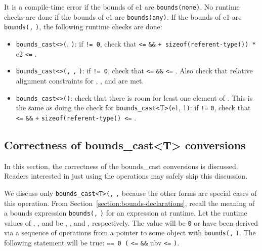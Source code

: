 It is a compile-time error if the bounds of e1 are
\texttt{bounds(none)}. No runtime checks are done if the bounds of e1
are \texttt{bounds(any)}. If the bounds of e1 are
\texttt{bounds(}\texttt{,} \texttt{)}, the following
runtime checks are done:

\begin{itemize}
\item
  \texttt{bounds\_cast\textless{}}\texttt{\textgreater{}(},
  \texttt{)}: if  \texttt{!= 0}, check that 
  \texttt{\textless{}=}  \texttt{\&\&}  \texttt{+
  sizeof(referent-type(}\texttt{)) *} e2 \texttt{\textless{}=}
  .
\item
  \texttt{bounds\_cast\textless{}}\texttt{\textgreater{}(}\texttt{,}
  \texttt{,} \texttt{)}: if  \texttt{!= 0},
  check that  \texttt{\textless{}=}  \texttt{\&\&}
   \texttt{\textless{}=} . Also check that relative
  alignment constraints for , , and  are met.
\item
  \texttt{bounds\_cast\textless{}}\texttt{\textgreater{}(}\texttt{)}:
  check that there is room for least one element of . This is
  the same as doing the check for
  \texttt{bounds\_cast\textless{}}T\texttt{\textgreater{}(}e1,
  1\texttt{)}: if  \texttt{!=} \texttt{0}, check that 
  \texttt{\textless{}=}  \texttt{\&\&}  \texttt{+}
  \texttt{sizeof(referent-type(}\texttt{) \textless{}=}
  .
\end{itemize}

\subsection{Correctness of bounds\_cast\textless{}T\textgreater{} conversions}

In this section, the correctness of the bounds\_cast conversions is
discussed. Readers interested in just using the operations may safely
skip this discussion.

We discuss only
\texttt{bounds\_cast\textless{}T\textgreater{}(}\texttt{,}
\texttt{,}  because the other forms are special cases
of this operation. From Section~\ref{section:bounds-declarations},
recall the meaning of a bounds
expression \texttt{bounds(}\texttt{,} \texttt{)} for
an expression  at runtime. Let the runtime values of ,
, and  be , , and ,
respectively. The value  will be \texttt{0} or have been
derived via a sequence of operations from a pointer to some object
 with \texttt{bounds(}\texttt{,}
\texttt{)}. The following statement will be true: 
\texttt{== 0 \textbar{}\textbar{} (} \texttt{\textless{}=}
 \texttt{\&\&} ubv \texttt{\textless{}=}
\texttt{)}.

